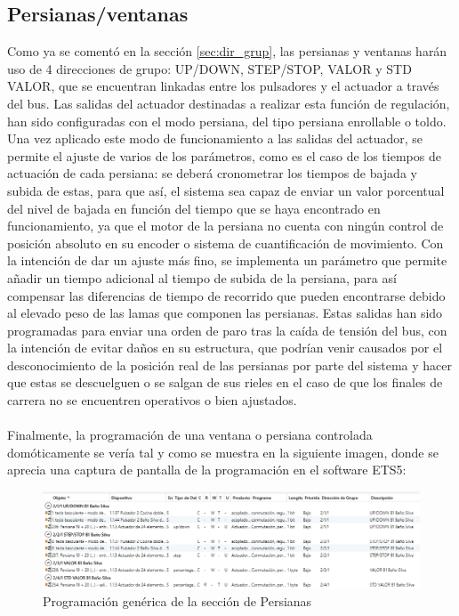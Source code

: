\subsection{Persianas/ventanas}Como ya se comentó en la sección \ref{sec:dir_grup}, las persianas y ventanas harán uso de 4 direcciones de grupo: UP/DOWN, STEP/STOP, VALOR y STD VALOR, que se encuentran linkadas entre los pulsadores y el actuador a través del bus. Las salidas del actuador destinadas a realizar esta función de regulación, han sido configuradas con el modo persiana, del tipo persiana enrollable o toldo. Una vez aplicado este modo de funcionamiento a las salidas del actuador, se permite el ajuste de varios de los parámetros, como es el caso de los tiempos de actuación de cada persiana: se deberá cronometrar los tiempos de bajada y subida de estas, para que así, el sistema sea capaz de enviar un valor porcentual del nivel de bajada en función del tiempo que se haya encontrado en funcionamiento, ya que el motor de la persiana no cuenta con ningún control de posición absoluto en su encoder o sistema de cuantificación de movimiento. Con la intención de dar un ajuste más fino, se implementa un parámetro que permite añadir un tiempo adicional al tiempo de subida de la persiana, para así compensar las diferencias de tiempo de recorrido que pueden encontrarse debido al elevado peso de las lamas que componen las persianas. Estas salidas han sido programadas para enviar una orden de paro tras la caída de tensión del bus, con la intención de evitar daños en su estructura, que podrían venir causados por el desconocimiento de la posición real de las persianas por parte del sistema y hacer que estas se descuelguen o se salgan de sus rieles en el caso de que los finales de carrera no se encuentren operativos o bien ajustados.\\\\
Finalmente, la programación de una ventana o persiana controlada domóticamente se vería tal y como se muestra en la siguiente imagen, donde se aprecia una captura de pantalla de la programación en el software ETS5:
 \begin{center}
\begin{figure}[H]
\includegraphics[width=1.15\textwidth]{figures/prog_pers.png}   
\caption{Programación genérica de la sección de Persianas}
\label{fig:prog_pers}
\end{figure}
\end{center}


